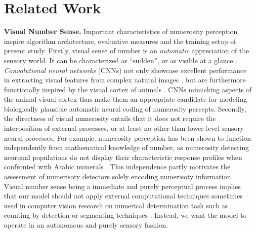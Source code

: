 \documentclass[twocolumn]{article}
\begin{document}
\hypertarget{related-work}{%
\section{Related Work}\label{related-work}}

\newcommand{\relatedss}[2]{{\bfseries #1. }{#2}}

\relatedss{Visual Number Sense}{Important characteristics of numerosity perception inspire algorithm architecture, evaluative measures and the  training setup of present study. Firstly, visual sense of number is an \emph{automatic} appreciation of the sensory world. It can be characterized as ``sudden'', or as visible at a glance \citetext{\citealp[p.~57]{dehaene2011number}; \citealp{zhang2016salient}}. \emph{Convolutional neural networks} (CNNs) not only showcase excellent performance in extracting visual features from complex natural images \citetext{\citealp{GoogleDeepMind}; \citealp{krizhevsky2012imagenet}; \citealp[for visual number sense and CNNs see][]{zhang2016salient}}, but are furthermore functionally inspired by the visual cortex of animals \citep[specifically cats, see][]{lecun1995convolutional}. CNNs mimicking aspects of the animal visual cortex thus make them an appropriate candidate for modeling biologically plausible automatic neural coding of numerosity percepts. 
Secondly, the directness of visual numerosity entails that it does not require the interposition of external processes, or at least no other than lower-level sensory neural processes. For example, numerosity perception has been shown to function independently from mathematical knowledge of number, as numerosity detecting neuronal populations do not display their characteristic response profiles when confronted with Arabic numerals \citep{harvey2013topographic, poncet2016individuation}. This independence partly motivates the assessment of numerisoty detectors solely encoding numerisoty information. Visual number sense being a immediate and purely perceptual process implies that our model should not apply external computational techniques sometimes used in computer vision research on numerical determination task such as counting-by-detection \citep[which requires both arithmetic and iterative attention to all group members, see][]{zhang2016salient, detection2016unconstrained} or segmenting techniques \citep[e.g.][]{chattopadhyay2016counting}. Instead, we want the model to operate in an autonomous and purely sensory fashion.}
\end{document}
